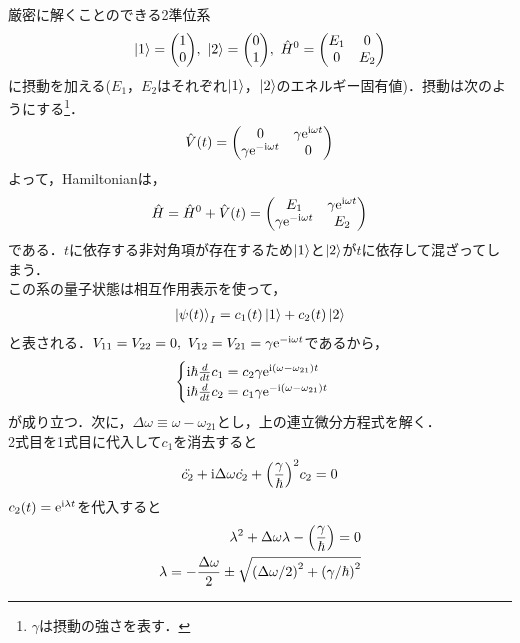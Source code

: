 \documentclass{report}
\begin{document}
  厳密に解くことのできる2準位系
  \begin{align}
    \ket{1} = \mqty(
      1\\
      0
    ),\ 
    \ket{2} = \mqty(
      0\\
      1
    ),\ 
    \hat{H}^0 = \mqty(
      E_1  &  0\\
      0  &  E_2
    )
  \end{align}
  に摂動を加える($E_1$，$E_2$はそれぞれ$\ket{1}$，$\ket{2}$のエネルギー固有値)．摂動は次のようにする\footnote{$\gamma$は摂動の強さを表す．}．
  \begin{align}
    \hat{V}(t) = \mqty(
      0 &  \gamma\e^{\i\omega t}\\
      \gamma \e^{ - \i\omega t} & 0
    )
  \end{align}
  よって，Hamiltonianは，
  \begin{align}
    \hat{H} = \hat{H}^0 + \hat{V}(t) = \mqty(
      E_1 & \gamma\e^{\i\omega t}\\
      \gamma\e^{ - \i\omega t} & E_2
    )
  \end{align}
  である．$t$に依存する非対角項が存在するため$\ket{1}$と$\ket{2}$が$t$に依存して混ざってしまう．\\
  この系の量子状態は相互作用表示を使って，
  \begin{align}
    \ket{\psi(t)}_I = c_1(t)\ket{1} + c_2(t)\ket{2}
  \end{align}
  と表される．$V_{11} = V_{22} = 0,\ V_{12} = V_{21} = \gamma\mathrm{e}^{ - \mathrm{i}\omega t}$であるから，
  \begin{align}
    \begin{cases}
      \mathrm{i}\hbar\frac{d}{dt}c_1 = c_2\gamma\mathrm{e}^{\mathrm{i}(\omega - \omega_{21})t}\\
      \mathrm{i}\hbar\frac{d}{dt}c_2 = c_1\gamma\mathrm{e}^{ - \mathrm{i}(\omega - \omega_{21})t}
    \end{cases}
  \end{align}
  が成り立つ．次に，$\Delta\omega\equiv\omega - \omega_{21}$とし，上の連立微分方程式を解く．\\
  2式目を1式目に代入して$c_1$を消去すると
  \begin{align}
    \ddot{c_2} + \mathrm{i}\Delta\omega\dot{c_2} + \qty(\frac{\gamma}{\hbar})^2c_2 = 0
  \end{align}
  $c_2(t) = \mathrm{e}^{\mathrm{i}\lambda t}$を代入すると
  \begin{align}
    \lambda^2 + \Delta\omega\lambda - \qty(\frac{\gamma}{\hbar}) = 0\\
    \lambda =  - \frac{\Delta\omega}{2}\pm\sqrt{\qty(\Delta\omega/2)^2 + \qty(\gamma/\hbar)^2}
  \end{align}
\end{document}
